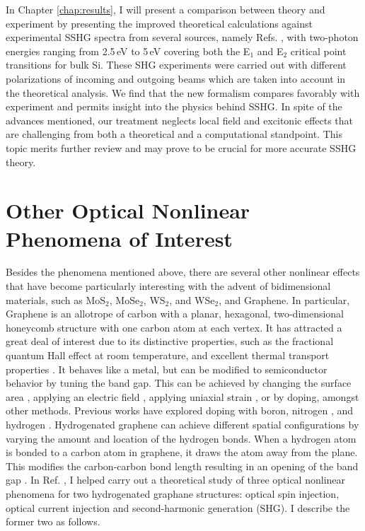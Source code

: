 In Chapter \ref{chap:results}, I will present a comparison between theory and
experiment by presenting the improved theoretical calculations against
experimental SSHG spectra from several sources, namely Refs. \cite{hoferAPA96,
bergfeldPRL04, mejiaPRB02, mitchellSS01}, with two-photon energies ranging from
2.5\,eV to 5\,eV covering both the E$_{1}$ and E$_{2}$ critical point
transitions for bulk Si. These SHG experiments were carried out with different
polarizations of incoming and outgoing beams which are taken into account in the
theoretical analysis. We find that the new formalism compares favorably with
experiment and permits insight into the physics behind SSHG. In spite of the
advances mentioned, our treatment neglects local field and excitonic effects
that are challenging from both a theoretical and a computational standpoint.
This topic merits further review and may prove to be crucial for more accurate
SSHG theory.



\section{Other Optical Nonlinear Phenomena of Interest}

Besides the phenomena mentioned above, there are several other nonlinear effects
that have become particularly interesting with the advent of bidimensional
materials, such as MoS$_{2}$, MoSe$_{2}$, WS$_{2}$, and WSe$_{2}$, and Graphene.
In particular, Graphene is an allotrope of carbon with a planar, hexagonal,
two-dimensional honeycomb structure with one carbon atom at each vertex. It has
attracted a great deal of interest due to its distinctive properties, such as
the fractional quantum Hall effect at room temperature, and excellent thermal
transport properties \cite{geimNM07, reinaNL08, novoselov2S7, balandinNL08}. It
behaves like a metal, but can be modified to semiconductor behavior by tuning
the band gap. This can be achieved by changing the surface area \cite{hanPRL07},
applying an electric field \cite{zhangN09}, applying uniaxial strain
\cite{niACSN08}, or by doping, amongst other methods. Previous works have
explored doping with boron, nitrogen \cite{guoIJ11}, and hydrogen
\cite{eliasS09, guisingerNL09, samarakoonACSN10}. Hydrogenated graphene can
achieve different spatial configurations by varying the amount and location of
the hydrogen bonds. When a hydrogen atom is bonded to a carbon atom in graphene,
it draws the atom away from the plane. This modifies the carbon-carbon bond
length resulting in an opening of the band gap \cite{eliasS09, boukhvalovPRB08}.
In Ref. \cite{zapataPSSB16}, I helped carry out a theoretical study of three
optical nonlinear phenomena for two hydrogenated graphane structures: optical
spin injection, optical current injection and second-harmonic generation (SHG).
I describe the former two as follows.


